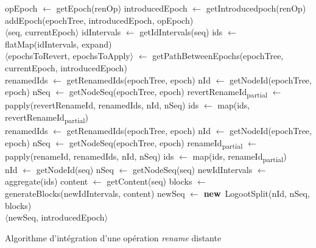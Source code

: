 \documentclass[12pt]{thesul}
\newcommand{\new}{\textbf{new}}
\newcommand{\lepoch}{$<_{\varepsilon}$~}
\begin{document}
\begin{algorithm}[!ht]
  \footnotesize
  \begin{algorithmic}[5]
          \State opEpoch $\gets$ getEpoch(renOp)
          \State introducedEpoch $\gets$ getIntroducedpoch(renOp)
          \\
          \State addEpoch(epochTree, introducedEpoch, opEpoch) \label{alg:renameRemote-addEpoch}
          \\
          \If{introducedEpoch \lepoch currentEpoch}
            \State \Return $\langle$seq, currentEpoch$\rangle$ \label{alg:renameRemote-return-1}
          \Else
            \State idIntervals $\gets$ getIdIntervals(seq) \label{alg:renameRemote-getIdIntervals}
            \State ids $\gets$ flatMap(idIntervals, expand) \label{alg:renameRemote-getIds}
            \\
            \State $\langle$epochsToRevert, epochsToApply$\rangle$ $\gets$ getPathBetweenEpochs(epochTree, currentEpoch, introducedEpoch) \label{alg:renameRemote-get-path}
            \\
             \label{alg:renameRemote-rename-1}
              \State renamedIds $\gets$ getRenamedIds(epochTree, epoch)
              \State nId $\gets$ getNodeId(epochTree, epoch)
              \State nSeq $\gets$ getNodeSeq(epochTree, epoch)
              \State revertRenameId\textsubscript{partial} $\gets$ papply(revertRenameId, renamedIds, nId, nSeq)
              \State ids $\gets$ map(ids, revertRenameId\textsubscript{partial})
            \EndFor
            \\
              \State renamedIds $\gets$ getRenamedIds(epochTree, epoch)
              \State nId $\gets$ getNodeId(epochTree, epoch)
              \State nSeq $\gets$ getNodeSeq(epochTree, epoch)
              \State renameId\textsubscript{partial} $\gets$ papply(renameId, renamedIds, nId, nSeq)
              \State ids $\gets$ map(ids, renameId\textsubscript{partial})
            \EndFor \label{alg:renameRemote-rename-2}
            \\
            \State nId $\gets$ getNodeId(seq)
            \State nSeq $\gets$ getNodeSeq(seq)
            \State newIdIntervals $\gets$ aggregate(ids)
            \State content $\gets$ getContent(seq)
            \State blocks $\gets$ generateBlocks(newIdIntervals, content)
            \State newSeq $\gets$ \new~LogootSplit(nId, nSeq, blocks) \label{alg:renameRemote-newSeq}
            \\
            \State \Return $\langle$newSeq, introducedEpoch$\rangle$ \label{alg:renameRemote-return-2}
        \EndIf
      \EndFunction
  \end{algorithmic}
  \caption{Algorithme d'intégration d'une opération \emph{rename} distante}
  \label{alg:renameRemote}
\end{algorithm}
\end{document}
